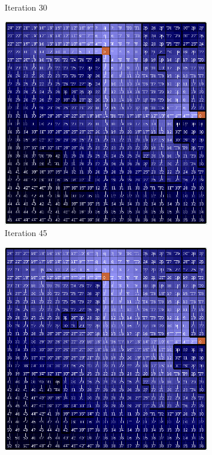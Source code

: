 \documentclass[letterpaper]{article}
\begin{document}
\begin{figure}
\begin{subfigure}{.3\textwidth}
			\caption{Iteration 30}
		\end{subfigure}
		\begin{subfigure}{.3\textwidth}
			\centering
			\includegraphics[width=\linewidth]{images/big_vi_45}
			\caption{Iteration 45}
		\end{subfigure}
		\begin{subfigure}{.3\textwidth}
			\centering
			\includegraphics[width=\linewidth]{images/big_vi_60}

\end{subfigure}
\end{figure}
\end{document}
